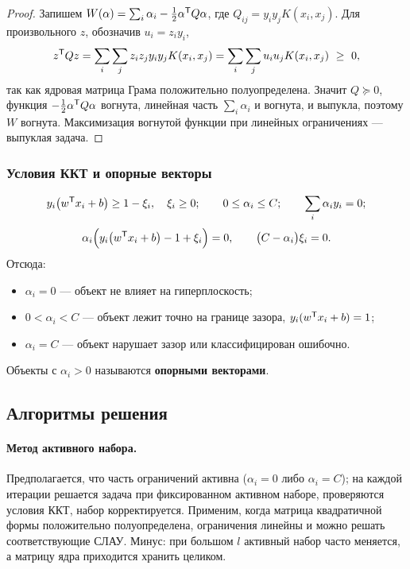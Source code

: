 \begin{proof}
Запишем $W(\alpha) = \sum_i \alpha_i - \tfrac12 \alpha^{\mathsf{T}} Q \alpha$, где
$Q_{ij} = y_i y_j K(x_i,x_j)$. Для произвольного $z$, обозначив
$u_i = z_i y_i$,
\[
  z^{\mathsf{T}} Q z = \sum_{i}\sum_j z_i z_j y_i y_j K(x_i,x_j)
          = \sum_{i}\sum_j u_i u_j K(x_i, x_j) \ \ge\ 0 ,
\]
так как ядровая матрица Грама положительно полуопределена. Значит
$Q \succeq 0$, функция $-\tfrac12\alpha^{\mathsf{T}} Q\alpha$ вогнута, линейная часть
$\sum_i\alpha_i$ и вогнута, и выпукла, поэтому $W$ вогнута. Максимизация
вогнутой функции при линейных ограничениях — выпуклая задача.
\end{proof}

\subsubsection*{Условия ККТ и опорные векторы}

\[
  y_i\big(w^{\mathsf{T}} x_i + b\big) \ge 1 - \xi_i ,\quad \xi_i \ge 0 ;
  \qquad 0 \le \alpha_i \le C ;
  \qquad \sum_i \alpha_i y_i = 0 ;
\]
\[
  \alpha_i\Big(y_i\big(w^{\mathsf{T}} x_i + b\big) - 1 + \xi_i\Big) = 0 ,
  \qquad
  \big(C - \alpha_i\big)\xi_i = 0 .
\]
Отсюда:
\begin{itemize}[nosep,left=0pt]
  \item $\alpha_i = 0$ — объект не влияет на гиперплоскость;
  \item $0 < \alpha_i < C$ — объект лежит точно на границе зазора,
        $y_i(w^{\mathsf{T}} x_i + b) = 1$;
  \item $\alpha_i = C$ — объект нарушает зазор или классифицирован ошибочно.
\end{itemize}
Объекты с $\alpha_i > 0$ называются \textbf{опорными векторами}.

\subsection{Алгоритмы решения}

\paragraph{Метод активного набора.}
Предполагается, что часть ограничений активна ($\alpha_i = 0$ либо
$\alpha_i = C$); на каждой итерации решается задача при фиксированном активном
наборе, проверяются условия ККТ, набор корректируется. Применим, когда матрица
квадратичной формы положительно полуопределена, ограничения линейны и можно
решать соответствующие СЛАУ. Минус: при большом $l$ активный набор часто
меняется, а матрицу ядра приходится хранить целиком.

